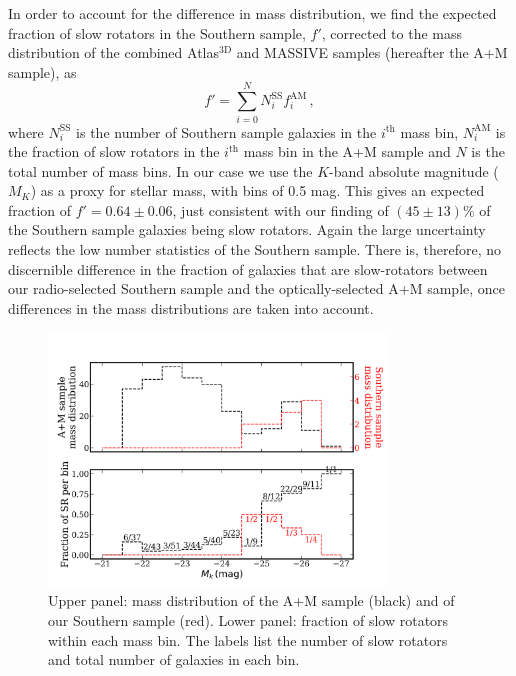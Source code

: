 		In order to account for the difference in mass distribution, we find the expected fraction of slow rotators in the Southern sample, $f'$, corrected to the mass distribution of the combined Atlas$^\text{3D}$ and MASSIVE samples (hereafter the A+M sample), as
		\begin{equation}
			f' = \sum_{i=0}^N N^\mathrm{SS}_i f^\mathrm{AM}_i \, , 
		\end{equation}
		where $N^\mathrm{SS}_i$ is the number of Southern sample galaxies in the $i^\mathrm{th}$ mass bin, $N^\mathrm{AM}_i$ is the fraction of slow rotators in the $i^\mathrm{th}$ mass bin in the A+M sample and $N$ is the total number of mass bins. In our case we use the $K$-band absolute magnitude ($M_K$) as a proxy for stellar mass, with bins of 0.5 mag. This gives an expected fraction of $f' = 0.64 \pm 0.06$, just consistent with our finding of $(45\pm13)$\% of the Southern sample galaxies being slow rotators. Again the large uncertainty reflects the low number statistics of the Southern sample. There is, therefore, no discernible difference in the fraction of galaxies that are slow-rotators between our radio-selected Southern sample and the optically-selected A+M sample, once differences in the mass distributions are taken into account. 

		\begin{figure}
			\centering
			\includegraphics[width=0.8\textwidth]{chapter4/M_k_binned.png}
			\caption[Mass matching global kinematics]{Upper panel: mass distribution of the A+M sample (black) and of our Southern sample (red). Lower panel: fraction of slow rotators within each mass bin. The labels list the number of slow rotators and total number of galaxies in each bin.}
			\label{fig:SRmassFraction}
		\end{figure}

